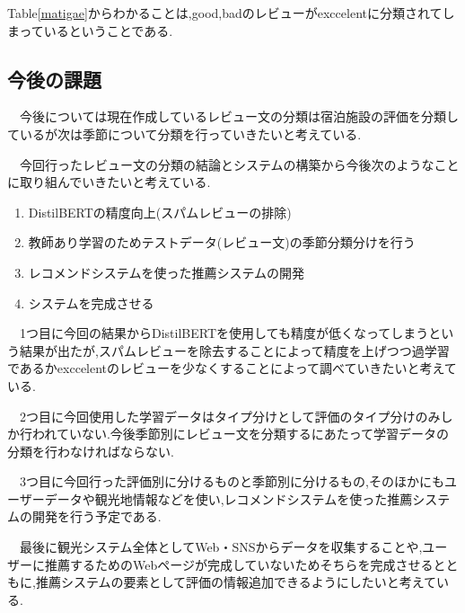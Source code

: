 \documentclass[twocolumn,dvipdfmx]{article}
\newcounter{ex}
\begin{document}
Table\ref{matigae}からわかることは,good,badのレビューがexccelentに分類されてしまっているということである.
 
\subsection{今後の課題}
　今後については現在作成しているレビュー文の分類は宿泊施設の評価を分類しているが次は季節について分類を行っていきたいと考えている.
 
　今回行ったレビュー文の分類の結論とシステムの構築から今後次のようなことに取り組んでいきたいと考えている.
\begin{enumerate}
  \item DistilBERTの精度向上(スパムレビューの排除)
  \item 教師あり学習のためテストデータ(レビュー文)の季節分類分けを行う
  \item レコメンドシステムを使った推薦システムの開発
  \item システムを完成させる
\end{enumerate}

　1つ目に今回の結果からDistilBERTを使用しても精度が低くなってしまうという結果が出たが,スパムレビューを除去することによって精度を上げつつ過学習であるかexccelentのレビューを少なくすることによって調べていきたいと考えている.

　2つ目に今回使用した学習データはタイプ分けとして評価のタイプ分けのみしか行われていない.今後季節別にレビュー文を分類するにあたって学習データの分類を行わなければならない.
 
　3つ目に今回行った評価別に分けるものと季節別に分けるもの,そのほかにもユーザーデータや観光地情報などを使い,レコメンドシステムを使った推薦システムの開発を行う予定である.
 
　最後に観光システム全体としてWeb・SNSからデータを収集することや,ユーザーに推薦するためのWebページが完成していないためそちらを完成させるとともに,推薦システムの要素として評価の情報追加できるようにしたいと考えている.

%
\end{document}
